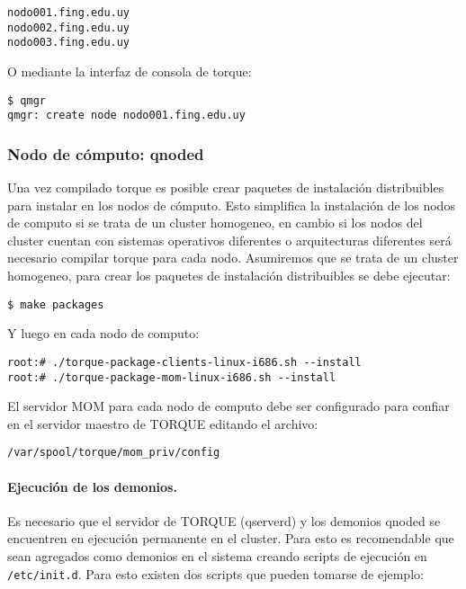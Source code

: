 \documentclass[a4paper,10pt,spanish]{article}
\begin{document}
\begin{verbatim}
nodo001.fing.edu.uy
nodo002.fing.edu.uy
nodo003.fing.edu.uy
\end{verbatim}

O mediante la interfaz de consola de torque:

\begin{verbatim}
$ qmgr
qmgr: create node nodo001.fing.edu.uy
\end{verbatim}

\subsubsection{Nodo de c\'{o}mputo: qnoded}

Una vez compilado torque es posible crear paquetes de instalaci\'{o}n distribuibles para instalar en los nodos de c\'{o}mputo. Esto simplifica la instalaci\'{o}n de los nodos de computo si se trata de un cluster homogeneo, en cambio si los nodos del cluster cuentan con sistemas operativos diferentes o arquitecturas diferentes ser\'{a} necesario compilar torque para cada nodo. Asumiremos que se trata de un cluster homogeneo, para crear los paquetes de instalaci\'{o}n distribuibles se debe ejecutar:

\begin{verbatim}
$ make packages
\end{verbatim}

Y luego en cada nodo de computo:

\begin{verbatim}
root:# ./torque-package-clients-linux-i686.sh --install
root:# ./torque-package-mom-linux-i686.sh --install
\end{verbatim}

El servidor MOM para cada nodo de computo debe ser configurado para confiar en el servidor maestro de TORQUE editando el archivo:

\begin{verbatim}
/var/spool/torque/mom_priv/config
\end{verbatim}

\paragraph{Ejecuci\'{o}n de los demonios.}

Es necesario que el servidor de TORQUE (qserverd) y los demonios qnoded se encuentren en ejecuci\'{o}n permanente en el cluster. Para esto es recomendable que sean agregados como demonios en el sistema creando scripts de ejecuci\'{o}n en \mbox{\texttt{/etc/init.d}}. Para esto existen dos scripts que pueden tomarse de ejemplo:
\end{document}
